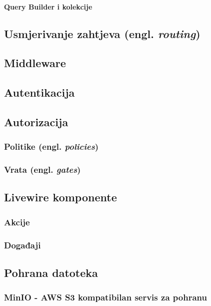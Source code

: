 \paragraph{Query Builder i kolekcije}

\subsection{Usmjerivanje zahtjeva (engl. \textit{routing})}

\subsection{Middleware}

\subsection{Autentikacija}

\subsection{Autorizacija}

\subsubsection{Politike (engl. \textit{policies})}

\subsubsection{Vrata (engl. \textit{gates})}

\subsection{Livewire komponente}

\subsubsection{Akcije}

\subsubsection{Događaji}

\subsection{Pohrana datoteka}

\subsubsection{MinIO - AWS S3 kompatibilan servis za pohranu}


